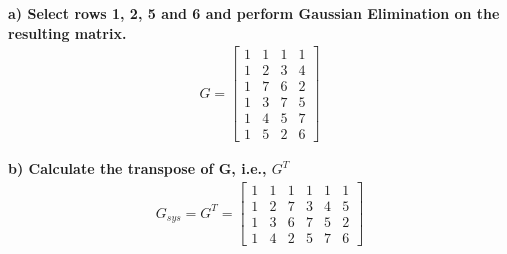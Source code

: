 \noindent\textbf{a) Select rows 1, 2, 5 and 6 and perform Gaussian Elimination on the resulting matrix.}\\
\begin{align}
    G = 
    \begin{bmatrix}
        1 & 1 & 1 & 1 \\
        1 & 2 & 3 & 4 \\
        1 & 7 & 6 & 2 \\
        1 & 3 & 7 & 5 \\
        1 & 4 & 5 & 7 \\
        1 & 5 & 2 & 6         
    \end{bmatrix}
\end{align}

\noindent\textbf{b) Calculate the transpose of G, i.e., $G^T$}\\
\begin{align}
    G_{sys} = G^T = 
    \begin{bmatrix}
        1 & 1 & 1 & 1 & 1 & 1 \\
        1 & 2 & 7 & 3 & 4 & 5 \\
        1 & 3 & 6 & 7 & 5 & 2 \\
        1 & 4 & 2 & 5 & 7 & 6 
    \end{bmatrix}
\end{align}

